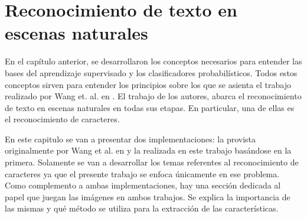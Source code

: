 \newpage	
\section{Reconocimiento de texto en escenas naturales}

	En el capítulo anterior, se desarrollaron los conceptos necesarios para entender las bases del aprendizaje supervisado y los clasificadores probabilísticos. Todos estos conceptos sirven para entender los principios sobre los que se asienta el trabajo realizado por Wang et. al. en \cite{wang}. El trabajo de los autores, abarca el reconocimiento de texto en escenas naturales en todas sus etapas. En particular, una de ellas es el reconocimiento de caracteres.
	
	En este capitulo se van a presentar dos implementaciones: la provista originalmente por Wang et al. en \cite{wang} y la realizada en este trabajo basándose en la primera. Solamente se van a desarrollar los temas referentes al reconocimiento de caracteres ya que el presente trabajo se enfoca únicamente en ese problema. Como complemento a ambas implementaciones, hay una sección dedicada al papel que juegan las imágenes en ambos trabajos. Se explica la importancia de las mismas y qué método se utiliza para la extracción de las características.
	
	
		
	
	
	
	
	
	
	
